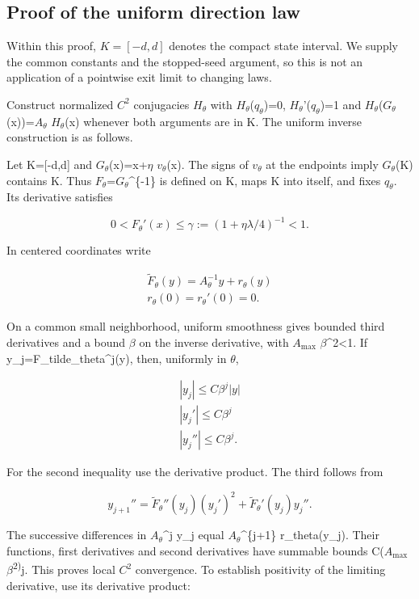 \subsection{Proof of the uniform direction law}\label{proof-of-the-uniform-direction-law}

Within this proof, \(K=[-d,d]\) denotes the compact state interval. We supply the common constants and the stopped-seed argument, so this is not an application of a pointwise exit limit to changing laws.

Construct normalized \(C^2\) conjugacies \(H_\theta\) with \(H_\theta\)(\(q_\theta\))=0, \(H_\theta\)'(\(q_\theta\))=1 and \(H_\theta\)(\(G_\theta\)(x))=\(A_\theta\) \(H_\theta\)(x) whenever both arguments are in K. The uniform inverse construction is as follows.

Let K={[}-d,d{]} and \(G_\theta\)(x)=x+\(\eta\) \(v_\theta\)(x). The signs of \(v_\theta\) at the endpoints imply \(G_\theta\)(K) contains K. Thus \(F_\theta\)=\(G_\theta\)\^{}\{-1\} is defined on K, maps K into itself, and fixes \(q_\theta\). Its derivative satisfies

\[
0<F_\theta'(x)\le \gamma:=(1+\eta\lambda/4)^{-1}<1.
\]

In centered coordinates write

\[
\begin{gathered}
\widetilde F_\theta(y)=A_\theta^{-1}y+r_\theta(y) \\
r_\theta(0)=r_\theta'(0)=0.
\end{gathered}
\]

On a common small neighborhood, uniform smoothness gives bounded third derivatives and a bound \(\beta\) on the inverse derivative, with \(A_{\max}\) \(\beta\)\^{}2\textless1. If y\_j=F\_tilde\_theta\^{}j(y), then, uniformly in \(\theta\),

\[
\begin{gathered}
|y_j|\le C\beta^j|y| \\
|y_j'|\le C\beta^j \\
|y_j''|\le C\beta^j.
\end{gathered}
\]

For the second inequality use the derivative product. The third follows from

\[
y_{j+1}''=\widetilde F_\theta''(y_j)(y_j')^2
             +\widetilde F_\theta'(y_j)y_j''.
\]

The successive differences in \(A_\theta\)\^{}j y\_j equal
\(A_\theta\)\^{}\{j+1\} r\_theta(y\_j). Their functions, first derivatives and second derivatives have summable bounds C(\(A_{\max}\) \(\beta\)\textsuperscript{2)}j. This proves local \(C^2\) convergence. To establish positivity of the limiting derivative, use its derivative product:

